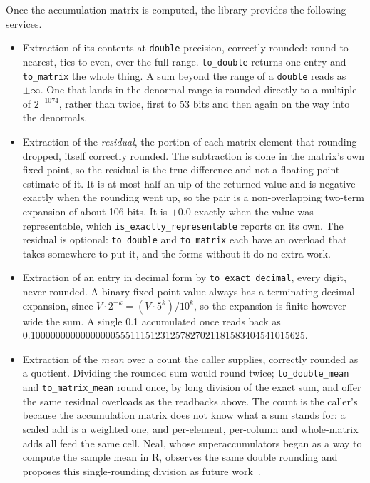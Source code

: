 \documentclass[acmsmall,screen,review]{acmart}
\newcommand{\code}[1]{\texttt{#1}}
\begin{document}
Once the accumulation matrix is computed, the library provides the following services.
\begin{itemize}
\item Extraction of its contents at \code{double} precision, correctly rounded: round-to-nearest, ties-to-even, over the full range. \code{to\_double} returns one entry and \code{to\_matrix} the whole thing. A sum beyond the range of a \code{double} reads as $\pm\infty$. One that lands in the denormal range is rounded directly to a multiple of $2^{-1074}$, rather than twice, first to 53 bits and then again on the way into the denormals.
\item Extraction of the \emph{residual}, the portion of each matrix element that rounding dropped, itself correctly rounded. The subtraction is done in the matrix's own fixed point, so the residual is the true difference and not a floating-point estimate of it. It is at most half an ulp of the returned value and is negative exactly when the rounding went up, so the pair is a non-overlapping two-term expansion of about 106 bits. It is $+0.0$ exactly when the value was representable, which \code{is\_exactly\_representable} reports on its own. The residual is optional: \code{to\_double} and \code{to\_matrix} each have an overload that takes somewhere to put it, and the forms without it do no extra work.
\item Extraction of an entry in decimal form by \code{to\_exact\_decimal}, every digit, never rounded. A binary fixed-point value always has a terminating decimal expansion, since $V \cdot 2^{-k} = (V \cdot 5^k)/10^k$, so the expansion is finite however wide the sum. A single 0.1 accumulated once reads back as 0.1000000000000000055511151231257827021181583404541015625.
\item Extraction of the \emph{mean} over a count the caller supplies, correctly rounded as a quotient. Dividing the rounded sum would round twice; \code{to\_double\_mean} and \code{to\_matrix\_mean} round once, by long division of the exact sum, and offer the same residual overloads as the readbacks above. The count is the caller's because the accumulation matrix does not know what a sum stands for: a scaled add is a weighted one, and per-element, per-column and whole-matrix adds all feed the same cell. Neal, whose superaccumulators began as a way to compute the sample mean in R, observes the same double rounding and proposes this single-rounding division as future work~\cite{neal2015}.
\end{itemize}
\end{document}

